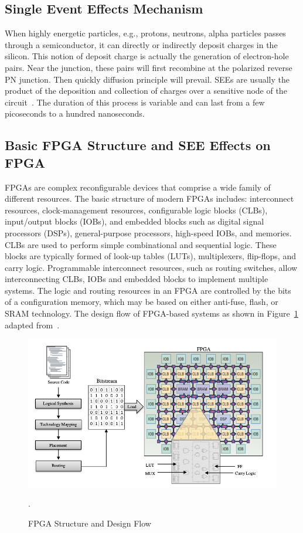 \subsection{Single Event Effects Mechanism}
When highly energetic particles, e.g., protons, neutrons, alpha particles passes through a semiconductor, it can directly or indirectly deposit charges in the silicon. This notion of deposit
charge is actually the generation of electron-hole pairs. Near the junction, these
pairs will first recombine at the polarized reverse PN junction.  Then quickly diffusion principle will prevail. SEEs are usually the product of the deposition and collection of charges over a sensitive node of the circuit~\citep{manuzzato2010single}. The duration of this
process is variable and can last from a few picoseconds to a hundred
nanoseconds.
\subsection{Basic FPGA Structure and SEE Effects on FPGA}
FPGAs are complex reconfigurable devices that comprise a wide family of different resources. The basic structure of modern FPGAs includes: interconnect resources, clock-management resources, configurable logic blocks (CLBs), input/output
blocks (IOBs), and embedded blocks such as digital signal processors (DSPs), general-purpose processors, high-speed IOBs, and memories. CLBs are used to perform simple
combinational and sequential logic. These blocks are typically formed of look-up tables
(LUTs), multiplexers, flip-flops, and carry logic. Programmable interconnect resources, such
as routing switches, allow interconnecting CLBs, IOBs and embedded blocks to implement multiple systems.
The logic and routing resources in an FPGA are controlled by the bits of a configuration memory, which may be based on either anti-fuse, flash, or SRAM technology. The
design flow of FPGA-based systems as shown in Figure~\ref{fig:fpga-struct} adapted from~\citep{hauck2010reconfigurable}.
\begin{figure}[tb!]
 \centering
  \captionsetup{justification=centering}    
   \includegraphics[scale=0.4]{figures/img/FPGA-structure.png}
   \caption{FPGA Structure and Design Flow~\citep{manuzzato2010single}}.
\label{fig:fpga-struct}
\end{figure}


